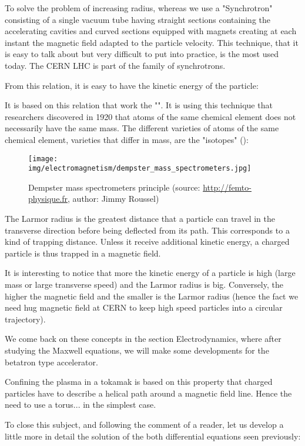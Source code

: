 	To solve the problem of increasing radius, whereas we use a "Synchrotron" consisting of a single vacuum tube having straight sections containing the accelerating cavities and curved sections equipped with magnets creating at each instant the magnetic field adapted to the particle velocity. This technique, that it is easy to talk about but very difficult to put into practice, is the most used today. The CERN LHC is part of the family of synchrotrons.

	From this relation, it is easy to have the kinetic energy of the particle:
	
	It is based on this relation that work the "". It is using this technique that researchers discovered in 1920 that atoms of the same chemical element does not necessarily have the same mass. The different varieties of atoms of the same chemical element, varieties that differ in mass, are the "isotopes" ():
	\begin{figure}[H]
		\centering
		\texttt{[image: img/electromagnetism/dempster\_mass\_spectrometers.jpg]}
		\caption[Dempster mass spectrometers principle]{Dempster mass spectrometers principle (source: \url{http://femto-physique.fr}, author: Jimmy Roussel)}
	\end{figure}
	The Larmor radius is the greatest distance that a particle can travel in the transverse direction before being deflected from its path. This corresponds to a kind of trapping distance. Unless it receive additional kinetic energy, a charged particle is thus trapped in a magnetic field.
	
	It is interesting to notice that more the kinetic energy of a particle is high (large mass or large transverse speed) and the Larmor radius is big. Conversely, the higher the magnetic field and the smaller is the Larmor radius (hence the fact we need hug magnetic field at CERN to keep high speed particles into a circular trajectory).

	We come back on these concepts in the section Electrodynamics, where after studying the Maxwell equations, we will make some developments for the betatron type accelerator.
	\begin{tcolorbox}[title=Remark,colframe=black,arc=10pt]
	Confining the plasma in a tokamak is based on this property that charged particles have to describe a helical path around a magnetic field line. Hence the need to use a torus... in the simplest case.
	\end{tcolorbox}
	To close this subject, and following the comment of a reader, let us develop a little more in detail the solution of the both differential equations seen previously:
	
